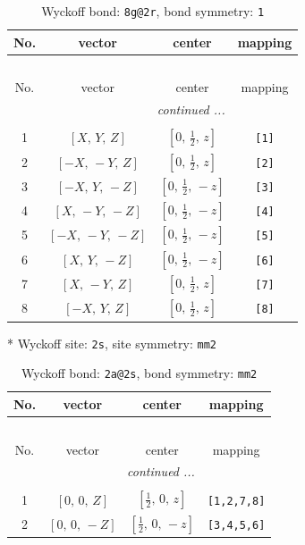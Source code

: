 \documentclass[fleqn,8pt]{jsarticle}
\begin{document}
\begin{longtable}{cccc}
\caption{Wyckoff bond: {\tt 8g@2r}, bond symmetry: {\tt 1}}
 \\
 \hline \hline
No. & vector & center & mapping \\ \hline \endfirsthead

\multicolumn{3}{l}{\tablename\ \thetable{}} \\
 \hline \hline
No. & vector & center & mapping \\ \hline \endhead

 \hline \hline
\multicolumn{3}{r}{\footnotesize\it continued ...} \\ \endfoot

 \hline \hline
\multicolumn{3}{r}{} \\ \endlastfoot

1 & $\left[ X,\, Y,\, Z \right]$ & $\left[ 0,\, \frac{1}{2},\, z \right]$ & {\tt [1]} \\ \hline
2 & $\left[ - X,\, - Y,\, Z \right]$ & $\left[ 0,\, \frac{1}{2},\, z \right]$ & {\tt [2]} \\ \hline
3 & $\left[ - X,\, Y,\, - Z \right]$ & $\left[ 0,\, \frac{1}{2},\, - z \right]$ & {\tt [3]} \\ \hline
4 & $\left[ X,\, - Y,\, - Z \right]$ & $\left[ 0,\, \frac{1}{2},\, - z \right]$ & {\tt [4]} \\ \hline
5 & $\left[ - X,\, - Y,\, - Z \right]$ & $\left[ 0,\, \frac{1}{2},\, - z \right]$ & {\tt [5]} \\ \hline
6 & $\left[ X,\, Y,\, - Z \right]$ & $\left[ 0,\, \frac{1}{2},\, - z \right]$ & {\tt [6]} \\ \hline
7 & $\left[ X,\, - Y,\, Z \right]$ & $\left[ 0,\, \frac{1}{2},\, z \right]$ & {\tt [7]} \\ \hline
8 & $\left[ - X,\, Y,\, Z \right]$ & $\left[ 0,\, \frac{1}{2},\, z \right]$ & {\tt [8]} \\
\end{longtable}
* Wyckoff site: {\tt 2s}, site symmetry: {\tt mm2}
\renewcommand{\arraystretch}{1.2}
\begin{longtable}{cccc}
\caption{Wyckoff bond: {\tt 2a@2s}, bond symmetry: {\tt mm2}}
 \\
 \hline \hline
No. & vector & center & mapping \\ \hline \endfirsthead

\multicolumn{3}{l}{\tablename\ \thetable{}} \\
 \hline \hline
No. & vector & center & mapping \\ \hline \endhead

 \hline \hline
\multicolumn{3}{r}{\footnotesize\it continued ...} \\ \endfoot

 \hline \hline
\multicolumn{3}{r}{} \\ \endlastfoot

1 & $\left[ 0,\, 0,\, Z \right]$ & $\left[ \frac{1}{2},\, 0,\, z \right]$ & {\tt [1,2,7,8]} \\ \hline
2 & $\left[ 0,\, 0,\, - Z \right]$ & $\left[ \frac{1}{2},\, 0,\, - z \right]$ & {\tt [3,4,5,6]} \\
\end{longtable}
\end{document}

